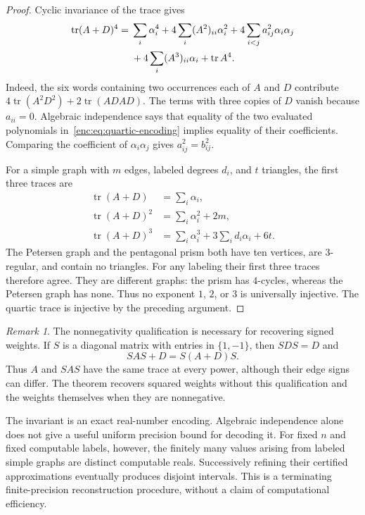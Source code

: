\documentclass[11pt,a4paper]{article}
\theoremstyle{definition}
\theoremstyle{remark}
\newtheorem{remark}[theorem]{Remark}
\numberwithin{equation}{section}
\begin{document}
\begin{proof}
Cyclic invariance of the trace gives
\begin{align}
 \operatorname{tr}(A+D)^4
 ={}&\sum_i\alpha_i^4
   +4\sum_i(A^2)_{ii}\alpha_i^2
   +4\sum_{i<j}a_{ij}^2\alpha_i\alpha_j \notag\\
   &+4\sum_i(A^3)_{ii}\alpha_i+\operatorname{tr}A^4.
 \label{enc:eq:quartic-encoding}
\end{align}
Indeed, the six words containing two occurrences each of $A$ and $D$
contribute $4\operatorname{tr}(A^2D^2)+2\operatorname{tr}(ADAD)$.
The terms with three copies of $D$ vanish because $a_{ii}=0$.
Algebraic independence says that equality of the two evaluated
polynomials in~\eqref{enc:eq:quartic-encoding} implies equality of their
coefficients.  Comparing the coefficient of $\alpha_i\alpha_j$ gives
$a_{ij}^2=b_{ij}^2$.

For a simple graph with $m$ edges, labeled degrees $d_i$, and $t$
triangles, the first three traces are
\begin{align*}
 \operatorname{tr}(A+D)&=\sum_i\alpha_i,\\
 \operatorname{tr}(A+D)^2&=\sum_i\alpha_i^2+2m,\\
 \operatorname{tr}(A+D)^3&=\sum_i\alpha_i^3
                  +3\sum_i d_i\alpha_i+6t.
\end{align*}
The Petersen graph and the pentagonal prism both have ten vertices,
are $3$-regular, and contain no triangles.  For any labeling their first
three traces therefore agree.  They are different graphs: the prism
has $4$-cycles, whereas the Petersen graph has none.  Thus no exponent
$1$, $2$, or $3$ is universally injective.  The quartic trace is
injective by the preceding argument.
\end{proof}

\begin{remark}
The nonnegativity qualification is necessary for recovering signed
weights.  If $S$ is a diagonal matrix with entries in $\{1,-1\}$, then
$SDS=D$ and
\[
 SAS+D=S(A+D)S.
\]
Thus $A$ and $SAS$ have the same trace at every power, although their
edge signs can differ.  The theorem recovers squared weights without
this qualification and the weights themselves when they are
nonnegative.
\end{remark}

The invariant is an exact real-number encoding.  Algebraic independence
alone does not give a useful uniform precision bound for decoding it.
For fixed $n$ and fixed computable labels, however, the finitely many
values arising from labeled simple graphs are distinct computable
reals.  Successively refining their certified approximations eventually
produces disjoint intervals.  This is a terminating finite-precision
reconstruction procedure, without a claim of computational efficiency.
\end{document}
